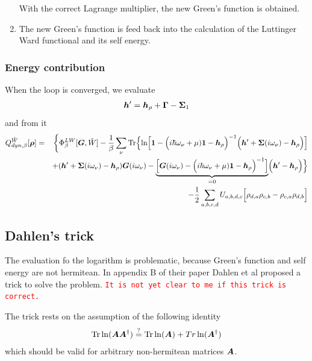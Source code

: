 \documentclass[11pt,a4paper]{report}
\newcommand{\petertt}[1]{\textcolor{red}{\texttt{#1}}}
\begin{document}
\begin{enumerate}
With the correct Lagrange multiplier, the new Green's function is
obtained.
%
\item The new Green's function is feed back into the calculation of
  the Luttinger Ward functional and its self energy.
\end{enumerate}

\subsubsection{Energy contribution}
When the loop is converged,  we evaluate 
\begin{eqnarray}
\bm{h}'=\bm{h}_\rho+\bm{\Gamma}-\bm{\Sigma}_1
\end{eqnarray}
and from it 
\begin{eqnarray}
Q^{\hat{W}}_{dyn,\beta}[\bm{\rho}]
&=&
\biggl\lbrace
\Phi^{LW}_\beta[\bm{G},\hat{W}]
-\frac{1}{\beta}\sum_\nu\mathrm{Tr}\Bigl\lbrace
\ln\Bigl[
\bm{1}-
\Bigl(i\hbar\omega_\nu+\mu)\bm{1}-\bm{h}_{\rho}\Bigr)^{-1}
\Bigl(\bm{h}'+\bm{\Sigma}(i\omega_\nu)-\bm{h}_{\rho}\Bigr)
\Bigr]
\nonumber\\&&
+(\bm{h}'+\bm{\Sigma}(i\omega_\nu)-\bm{h}_\rho)\bm{G}(i\omega_\nu)
-
\underbrace{\Bigl[
\bm{G}(i\omega_\nu)
-\Bigl(i\hbar\omega_\nu+\mu)\bm{1}-\bm{h}_{\rho}\Bigr)^{-1}
\Bigr]}_{=0}
\Bigl(\bm{h}'-\bm{h}_\rho\Bigr)\Bigr\rbrace
\nonumber\\
&&-
\frac{1}{2}\sum_{a,b,c,d}U_{a,b,d,c}
\Bigl[\rho_{d,a}\rho_{c,b}-\rho_{c,a}\rho_{d,b}\Bigr]
\label{eq:dmf1greena}
\end{eqnarray}

\subsection{Dahlen's trick}
The evaluation fo the logarithm is problematic, because Green's
function and self energy are not hermitean. In appendix B of their
paper\cite{dahlen06_pra73_12511} Dahlen et al proposed a trick to
solve the problem. \petertt{It is not yet clear to me if this trick is
  correct.}

The trick rests on the assumption of the following identity
\begin{eqnarray}
\mathrm{Tr}\ln(\bm{A}\bm{A}^\dagger)\stackrel{?}{=}
\mathrm{Tr}\ln(\bm{A})+Tr\ln(\bm{A}^\dagger)
\end{eqnarray}
which should be valid for arbitrary non-hermitean matrices $\bm{A}$.
\end{document}
